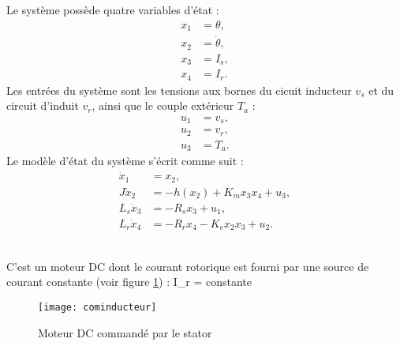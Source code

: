 Le système possède quatre variables d'état :
\begin{equation*} \begin{split}
x_1 &= \theta, \\
x_2 &= \dot{\theta}, \\
x_3 &= I_s, \\
x_4 &= I_r.
\end{split} \end{equation*}
Les entrées du système sont les tensions aux bornes du cicuit inducteur
$v_s$ et du circuit d'induit $v_r$, ainsi que le couple extérieur $T_a$ :
\begin{equation*} \begin{split}
u_1 &= v_s, \\
u_2 &= v_r, \\
u_3 &= T_a.
\end{split} \end{equation*}
Le modèle d'état du système s'écrit comme suit :
\begin{equation*} \begin{split}
\dot x_1 &= x_2,\\
J\dot x_2 &= -h(x_2) + K_m x_3x_4 + u_3,\\
L_s\dot x_3 &= -R_s x_3 + u_1,\\
L_r\dot x_4 &= -R_r x_4 - K_ex_2x_3 + u_2.
\end{split} \end{equation*}
\\

C'est un moteur DC dont le courant rotorique est fourni par une source de
courant constante (voir figure \ref{fig:cominducteur}) :
\eqnn
I_r = constante
\eeqnn
\begin{figure}[htbp]
\begin{center}
\texttt{[image: cominducteur]}
\caption{Moteur DC commandé par le stator}
\label{fig:cominducteur}
\end{center}
\end{figure}

